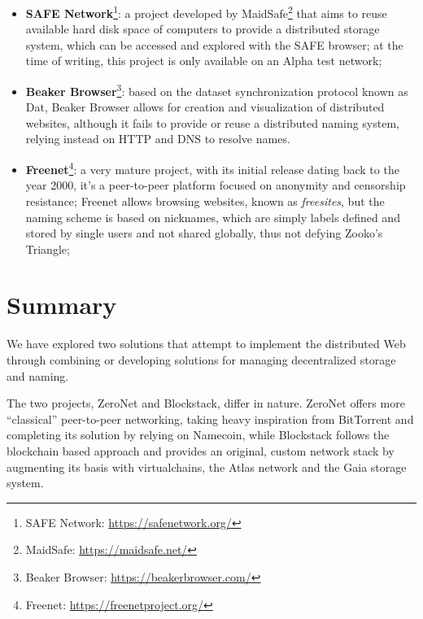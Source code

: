 \documentclass[mscthesis]{usiinfthesis}
\begin{document}
\begin{itemize}
	\item \textbf{SAFE Network}\footnote{SAFE Network: \url{https://safenetwork.org/}}: a project developed by MaidSafe\footnote{MaidSafe: \url{https://maidsafe.net/}} that aims to reuse available hard disk space of computers to provide a distributed storage system, which can be accessed and explored with the SAFE browser; at the time of writing, this project is only available on an Alpha test network;
	\item \textbf{Beaker Browser}\footnote{Beaker Browser: \url{https://beakerbrowser.com/}}: based on the dataset synchronization protocol known as Dat, Beaker Browser allows for creation and visualization of distributed websites, although it fails to provide or reuse a distributed naming system, relying instead on HTTP and DNS to resolve names.
	\item \textbf{Freenet}\footnote{Freenet: \url{https://freenetproject.org/}}: a very mature project, with its initial release dating back to the year 2000, it's a peer-to-peer platform focused on anonymity and censorship resistance; Freenet allows browsing websites, known as \emph{freesites}, but the naming scheme is based on nicknames, which are simply labels defined and stored by single users and not shared globally, thus not defying Zooko's Triangle;
\end{itemize}

\section{Summary}

We have explored two solutions that attempt to implement the distributed Web through combining or developing solutions for managing decentralized storage and naming.

The two projects, ZeroNet and Blockstack, differ in nature. ZeroNet offers more ``classical'' peer-to-peer networking, taking heavy inspiration from BitTorrent and completing its solution by relying on Namecoin, while Blockstack follows the blockchain based approach and provides an original, custom network stack by augmenting its basis with virtualchains, the Atlas network and the Gaia storage system.
\end{document}
